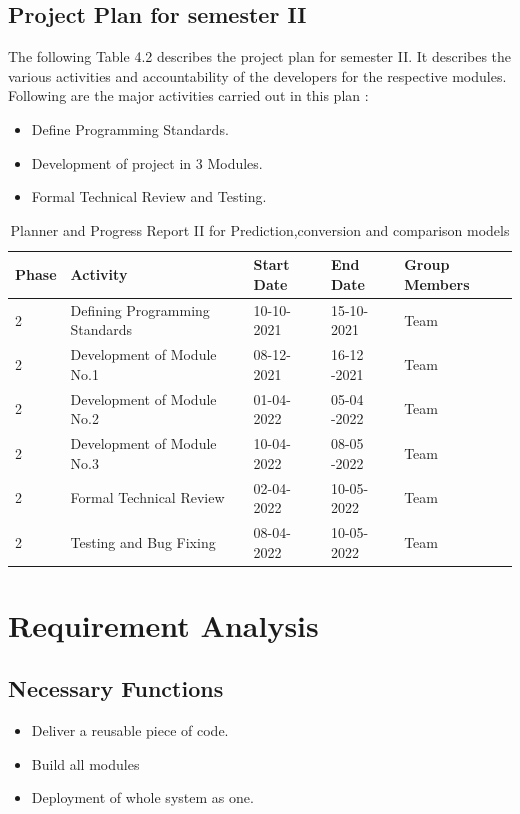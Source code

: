\documentclass[openany,12pt]{report}
\begin{document}
\subsection{Project Plan for semester II}
\hspace*{0.5in}The following Table 4.2 describes the project plan for semester II. It describes the various activities and accountability of the developers for the respective modules. Following are the major activities carried out in this plan :
\begin{itemize}
\item{Define Programming Standards.}
\item{Development of project in 3 Modules.}
\item{Formal Technical Review and Testing.}
\end{itemize}

\newpage
\begin{table} [htb]
\begin{tabular}{|p{1.2cm}|p{5cm}|p{2.5cm}|p{2.5cm}|p{3cm}| }\hline
\textbf{Phase}	&\textbf{Activity}	&\textbf{Start Date}	&\textbf{End Date} &\textbf{Group Members}\\\hline\hline
2 &Defining Programming Standards	&10-10-2021 	& 15-10-2021 &Team \\\hline
2 &Development of Module No.1 & 08-12-2021 & 16-12 -2021 &Team\\\hline
2 &Development of Module No.2 & 01-04-2022 & 05-04 -2022 &Team\\\hline
2 &Development of Module No.3 & 10-04-2022 & 08-05 -2022 & Team \\\hline
2 &Formal Technical Review &02-04-2022 &10-05-2022 &Team \\\hline
2 &Testing and Bug Fixing  & 08-04-2022 &10-05-2022 &Team\\\hline

\end{tabular}
\caption{Planner and Progress Report II for Prediction,conversion and comparison models}
\label{tab:nnwork}
\end{table}

\section{Requirement Analysis}

\subsection{Necessary Functions}
\begin{itemize}
\item{Deliver a reusable piece of code.}
\item{Build all modules}
\item{Deployment of whole system as one.}
\end{itemize}
\end{document}
